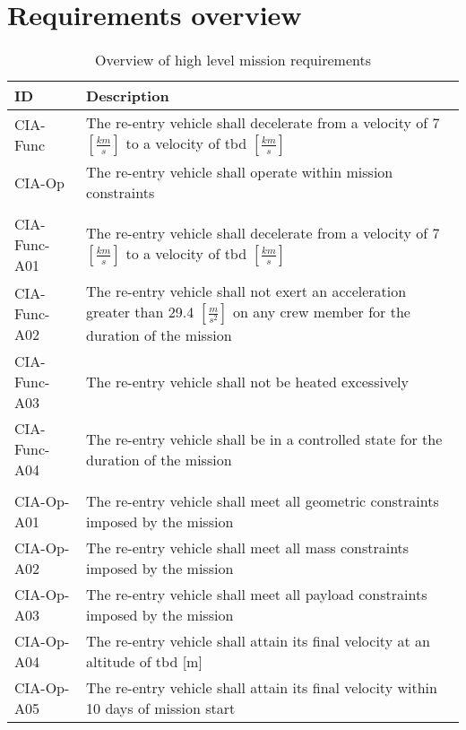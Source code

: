\section{Requirements overview} \label{app:req}

\begin{table}[H]
	\caption*{Overview of high level mission requirements} 
	\begin{tabular}{|p{}|p{}|}
    \hline
    ID          & Description                                                                                                      \\ \hline \hline
    CIA-Func & The re-entry vehicle shall decelerate from a velocity of 7 $[\frac{km}{s}]$ to a velocity of \gls{tbd} $[\frac{km}{s}]$  \\ \hline
    CIA-Op & The re-entry vehicle shall operate within mission constraints                                               \\ \hline
& \\ \hline
    CIA-Func-A01 & The re-entry vehicle shall decelerate from a velocity of 7 $[\frac{km}{s}]$ to a velocity of \gls{tbd} $[\frac{km}{s}]$     \\ \hline
    CIA-Func-A02 & The re-entry vehicle shall not exert an acceleration greater than 29.4 $[\frac{m}{s^2}]$ on any crew member for the duration of the mission			\\ \hline
    CIA-Func-A03 & The re-entry vehicle shall not be heated excessively  \\ \hline
    CIA-Func-A04 & The re-entry vehicle shall be in a controlled state for the duration of the mission                            \\ \hline
& \\ \hline
    CIA-Op-A01 & The re-entry vehicle shall meet all geometric constraints imposed by the mission                           \\ \hline
    CIA-Op-A02 & The re-entry vehicle shall meet all mass constraints imposed by the mission                                      \\ \hline
	CIA-Op-A03 & The re-entry vehicle shall meet all payload constraints imposed by the mission \\ \hline
	CIA-Op-A04 & The re-entry vehicle shall attain its final velocity at an altitude of \gls{tbd} [m] \\ \hline
	CIA-Op-A05 & The re-entry vehicle shall attain its final velocity within 10 days of mission start \\ \hline

\end{tabular}
\end{table}
